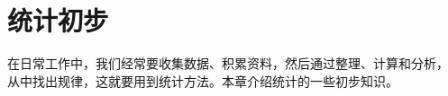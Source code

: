 \chapter{统计初步}

在日常工作中，我们经常要收集数据、积累资料，然后通过整理、计算和分析，
从中找出规律，这就要用到统计方法。本章介绍统计的一些初步知识。
















